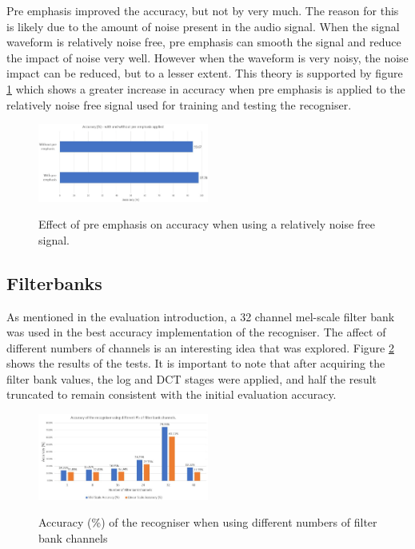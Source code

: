 \documentclass[journal]{IEEEtran}
\begin{document}
	Pre emphasis improved the accuracy, but not by very much. The reason for this is likely due to the amount of noise present in the audio signal. When the signal waveform is relatively noise free, pre emphasis can smooth the signal and reduce the impact of noise very well. However when the waveform is very noisy, the noise impact can be reduced, but to a lesser extent. This theory is supported by figure \ref{fig:eval_pre_nonoise} which shows a greater increase in accuracy when pre emphasis is applied to the relatively noise free signal used for training and testing the recogniser.
	\\
	\begin{figure}[!htb]
		\centering
		\captionsetup{justification=centering}
		\includegraphics[width=0.5\textwidth]{eval_pre_nonoise.jpg}\\
		\caption{Effect of pre emphasis on accuracy when using a relatively noise free signal. }\label{fig:eval_pre_nonoise}
	\end{figure}

	\subsection{Filterbanks}
	As mentioned in the evaluation introduction, a 32 channel mel-scale filter bank was used in the best accuracy implementation of the recogniser. The affect of different numbers of channels is an interesting idea that was explored. Figure \ref{fig:eval_filterbanks} shows the results of the tests. It is important to note that after acquiring the filter bank values, the log and DCT stages were applied, and half the result truncated to remain consistent with the initial evaluation accuracy.
	\\
	
	\begin{figure}[!htb]
		\centering
		\captionsetup{justification=centering}
		\includegraphics[width=0.5\textwidth]{eval_filterbanks.jpg}\\
		\caption{Accuracy (\%) of the recogniser when using different numbers of filter bank channels}\label{fig:eval_filterbanks}
	\end{figure}
\end{document}
